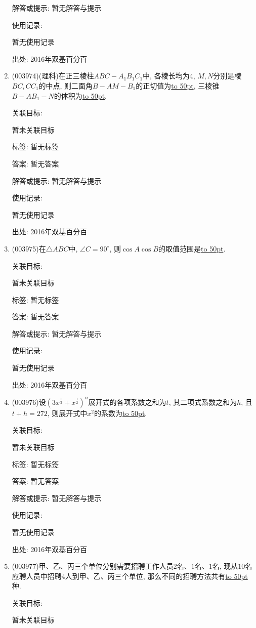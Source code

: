 \documentclass[10pt,a4paper]{article}
\newcommand{\blank}[1]{\underline{\hbox to #1pt{}}}
\begin{document}
\begin{enumerate}[1.]
解答或提示: 暂无解答与提示

使用记录:

暂无使用记录


出处: 2016年双基百分百
\item { (003974)}(理科)在正三棱柱$ABC-A_1B_1C_1$中, 各棱长均为$4$, $M,N$分别是棱$BC,CC_1$的中点, 则二面角$B-AM-B_1$的正切值为\blank{50}, 三棱锥$B-AB_1-N$的体积为\blank{50}.


关联目标:

暂未关联目标



标签: 暂无标签

答案: 暂无答案

解答或提示: 暂无解答与提示

使用记录:

暂无使用记录


出处: 2016年双基百分百
\item { (003975)}在$\triangle ABC$中, $\angle C=90^\circ$, 则$\cos A\cos B$的取值范围是\blank{50}.


关联目标:

暂未关联目标



标签: 暂无标签

答案: 暂无答案

解答或提示: 暂无解答与提示

使用记录:

暂无使用记录


出处: 2016年双基百分百
\item { (003976)}设$\left(3x^{\frac 13}+x^\frac 12\right)^n$展开式的各项系数之和为$t$, 其二项式系数之和为$h$, 且$t+h=272$, 则展开式中$x^2$的系数为\blank{50}.


关联目标:

暂未关联目标



标签: 暂无标签

答案: 暂无答案

解答或提示: 暂无解答与提示

使用记录:

暂无使用记录


出处: 2016年双基百分百
\item { (003977)}甲、乙、丙三个单位分别需要招聘工作人员$2$名、$1$名、$1$名, 现从$10$名应聘人员中招聘$4$人到甲、乙、丙三个单位, 那么不同的招聘方法共有\blank{50}种.


关联目标:

暂未关联目标




\end{enumerate}
\end{document}
